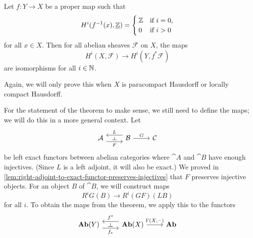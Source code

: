 \begin{thm}\label{thm:Vietoris-Begle-mapping-theorem}
Let \(f\colon Y\to X\) be a proper map such that
\[ H^i(f^{-1}(x),\underline{\mathbb{Z}}) =
  \begin{cases}
    \mathbb{Z} & \text{if } i = 0\text{,} \\
    0 & \text{if } i>0
  \end{cases}
\]
for all \(x\in X\).
Then for all abelian sheaves \(\mathcal F\) on \(X\), the maps
\[ H^i(X,\mathcal F)\to H^i(Y,f^*\mathcal F) \]
are isomorphisms for all \(i\in\mathbb{N}\).
\end{thm}

Again, we will only prove this when \(X\) is paracompact Hausdorff or locally compact Hausdorff.

For the statement of the theorem to make sense, we still need to define the maps; we will do this in a more general context.
Let
\begin{equation*}
  \begin{tikzcd}
    \cat A \ar[r, "F"'{name=rightadj}, shift right=2] &
    \cat B \ar[l, "L"'{name=leftadj}, shift right=2] \ar[r, "G"] &
    \cat C
    \ar[from=leftadj, to=rightadj, phantom, "\leftadj" rotate=-90]
  \end{tikzcd}
\end{equation*}
be left exact functors between abelian categories where \(\cat A\) and \(\cat B\) have enough injectives.
(Since \(L\) is a left adjoint, it will also be exact.)
We proved in \cref{lem:right-adjoint-to-exact-functor-preserves-injectives} that \(F\) preserves injective objects.
For an object \(B\) of \(\cat B\), we will construct maps
\[ R^iG(B) \to R^i(GF)(LB) \]
for all \(i\).
To obtain the maps from the theorem, we apply this to the functors
\begin{equation*}
  \begin{tikzcd}
    \catAbelianSheaf(Y) \ar[r, "f_*"'{name=rightadj}, shift right=2] &
    \catAbelianSheaf(X) \ar[l, "f^*"'{name=leftadj}, shift right=2] \ar[r, "{\Gamma(X,-)}"] &
    \catAbelianGroup
    \ar[from=leftadj, to=rightadj, phantom, "\leftadj" rotate=-90]
  \end{tikzcd}
\end{equation*}

